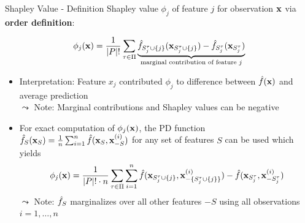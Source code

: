 \documentclass[11pt,compress,t,notes=noshow, aspectratio=169, xcolor=table]{beamer}
\begin{document}
\begin{frame}{Shapley Value - Definition  }
  Shapley value $\phi_j$ of feature $j$ for observation $\xv$ via \textbf{order definition}:

     $$ \phi_j(\xv)  = \frac{1}{|P|!} \sum_{\tau \in \Pi} \underbrace{\fh_{\Stauj}(\xv_{\Stauj}) - \fh_{\Stau}(\xv_{\Stau})}_{\text{marginal contribution of feature $j$}} $$ %
     
     
\begin{itemize}
    
  \item Interpretation: Feature $x_j$ contributed $\phi_j$ to difference between $\fh(\xv)$ and average prediction\\
  $\leadsto$ Note: Marginal contributions and Shapley values can be negative
   \item For exact computation of $\phi_j(\xv) $, the PD function 
   $\fh_{S}(\xv_S) = \frac{1}{n} \sum_{i=1}^n \fh(\xv_S, \xv_{-S}^{(i)})$ 
   for any set of features $S$ can be used which yields
    $$ \phi_j(\xv) = \frac{1}{|P|! \cdot n} \sum_{\tau \in \Pi} \sum_{i = 1}^n
   \fh(\xv_{\Stauj}, \xv_{\minusStauj}^{(i)}) - \fh(\xv_{\Stau}, \xv_{- \Stau}^{(i)})
   $$
   $\leadsto$ Note: $\fh_S$ marginalizes over all other features $-S$ using all observations $i = 1, \ldots, n$
   
\end{itemize}
\lz

\end{frame}
\end{document}
